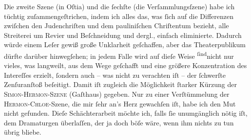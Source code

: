 \pstart
           Die zweite Szene (in Oſtia) und die ſechſte (die
               Verſammlungsſzene) habe ich tüchtig zuſammengeſtrichen, indem ich alles das, was ſich
               auf die Differenzen zwiſchen den Judenchriſten und dem pauliniſchen Chriſtentum
               bezieht, alle Streiterei um Revier und Beſchneidung und dergl., einfach eliminierte.
               Dadurch würde einem Leſer gewiß große Unklarheit geſchaffen, aber das Theaterpublikum
               dürfte darüber hinwegſehen; in jedem Falle wird auf dieſe Weise \substVorne{}\textsuperscript{ſind}\substDazwischen{}nicht\substHinten{} nur vieles, was langweilt, aus dem Wege geſchafft und eine größere
               Konzentration des Intereſſes erzielt, ſondern auch – {\pb}was nicht zu verachten iſt – der ſchwerſte
               Zenſuranſtoß beſeitigt. Damit iſt zugleich die Möglichkeit ſtarker Kürzung der \textsc{Simon-Hermon-Szene} (Gaſthaus) gegeben. Nur zu einer
               Verſtümmelung der \textsc{Hermon-Chloe}-Szene, die mir ſehr an’s
               Herz gewachſen iſt, habe ich den Mut nicht gefunden. Dieſe Schächterarbeit möchte
               ich, falls ſie unumgänglich nötig iſt, dem Dramaturgen überlaſſen, der ja doch böſe
               wäre, wenn ihm nichts zu tun übrig bliebe.\pend
           
